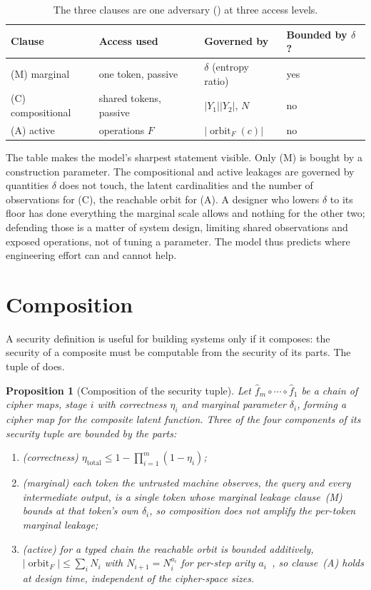 \documentclass[11pt]{article}
\newcommand{\fhat}{\hat{f}}
\newcommand{\orbitF}{\operatorname{orbit}_F}
\theoremstyle{definition}
\theoremstyle{plain}
\newtheorem{proposition}{Proposition}
\theoremstyle{remark}
\begin{document}
\begin{table}[t]
\centering
\caption{The three clauses are one adversary () at three access
levels.}
\label{tab:scales}
\begin{tabular}{@{}llll@{}}
\toprule
Clause & Access used & Governed by & Bounded by $\delta$? \\
\midrule
(M) marginal & one token, passive & $\delta$ (entropy ratio) & yes \\
(C) compositional & shared tokens, passive & $|Y_1||Y_2|$, $N$ & no \\
(A) active & operations $F$ & $|\orbitF(c)|$ & no \\
\bottomrule
\end{tabular}
\end{table}

The table makes the model's sharpest statement visible. Only (M) is bought by a
construction parameter. The compositional and active leakages are governed by
quantities $\delta$ does not touch, the latent cardinalities and the number of
observations for (C), the reachable orbit for (A). A designer who lowers
$\delta$ to its floor has done everything the marginal scale allows and nothing
for the other two; defending those is a matter of system design, limiting shared
observations and exposed operations, not of tuning a parameter. The model thus
predicts where engineering effort can and cannot help.

\section{Composition}
\label{sec:composition}

A security definition is useful for building systems only if it composes: the
security of a composite must be computable from the security of its parts. The
tuple of  does.

\begin{proposition}[Composition of the security tuple]
\label{prop:composition}
Let $\fhat_m \circ \cdots \circ \fhat_1$ be a chain of cipher maps, stage $i$
with correctness $\eta_i$ and marginal parameter $\delta_i$, forming a cipher map
for the composite latent function. Three of the four components of its security
tuple are bounded by the parts:
\begin{enumerate}
\item \emph{(correctness)} $\eta_{\mathrm{total}} \le 1 - \prod_{i=1}^m (1 - \eta_i)$;
\item \emph{(marginal)} each token the untrusted machine observes, the query and
  every intermediate output, is a single token whose marginal leakage clause~(M)
  bounds at that token's own $\delta_i$, so composition does not amplify the
  per-token marginal leakage;
\item \emph{(active)} for a typed chain the reachable orbit is bounded
  \emph{additively}, $|\orbitF| \le \sum_{i} N_i$ with $N_{i+1} = N_i^{a_i}$ for
  per-step arity $a_i$~\cite{towell2026algebraic}, so clause~(A) holds at design
  time, independent of the cipher-space sizes.
\end{enumerate}
\end{proposition}
\end{document}
